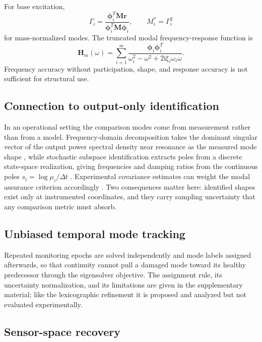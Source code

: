 \documentclass{ieeeaccess}
\newcommand{\M}{\mathbf{M}}
\newcommand{\Hq}{\mathbf{H}}
\newcommand{\ph}{\boldsymbol{\phi}}
\newcommand{\rr}{\mathbf{r}}
\begin{document}
For base excitation,
\begin{equation}
\Gamma_i=\frac{\ph_i^T\M\rr}{\ph_i^T\M\ph_i},
\qquad M_i^*=\Gamma_i^2
\label{eq:participation}
\end{equation}
for mass-normalized modes. The truncated modal frequency-response function is
\begin{equation}
\Hq_m(\omega)=\sum_{i=1}^{m}
\frac{\ph_i\ph_i^T}
{\omega_i^2-\omega^2+2\mathrm i\xi_i\omega_i\omega}.
\label{eq:frf}
\end{equation}
Frequency accuracy without participation, shape, and response accuracy is not sufficient for structural use.

\subsection{Connection to output-only identification}

In an operational setting the comparison modes come from measurement rather than from a model. Frequency-domain decomposition takes the dominant singular vector of the output power spectral density near resonance as the measured mode shape \cite{Brincker2001}, while stochastic subspace identification extracts poles from a discrete state-space realization, giving frequencies and damping ratios from the continuous poles $s_i=\log\mu_i/\Delta t$ \cite{Peeters1999,Peeters2001,Reynders2012}. Experimental covariance estimates can weight the modal assurance criterion accordingly \cite{Reynders2008}. Two consequences matter here: identified shapes exist only at instrumented coordinates, and they carry sampling uncertainty that any comparison metric must absorb.

\subsection{Unbiased temporal mode tracking}

Repeated monitoring epochs are solved independently and mode labels assigned afterwards, so that continuity cannot pull a damaged mode toward its healthy predecessor through the eigensolver objective. The assignment rule, its uncertainty normalization, and its limitations are given in the supplementary material; like the lexicographic refinement it is proposed and analyzed but not evaluated experimentally.

\subsection{Sensor-space recovery}
\end{document}
